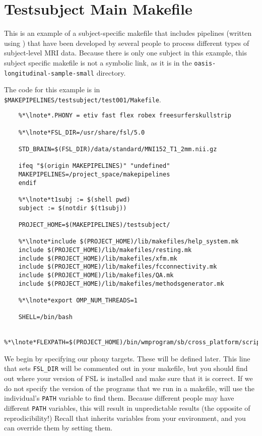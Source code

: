 \section{Testsubject Main Makefile}
\label{example:testsubjectxfm}

This is an example of a subject-specific makefile that includes
pipelines (written using \maken{}) that have been developed by several people to process different types of
subject-level MRI data. Because there is only one subject in
this example, this subject specific makefile is not a symbolic link,
as it is in the \texttt{oasis-longitudinal-sample-small} directory. 

The code for this example is in \texttt{\$MAKEPIPELINES/testsubject/test001/Makefile}. 

\setcounter{codehighlight}{0} %
\begin{lstlisting}
	%*\lnote*.PHONY = etiv fast flex robex freesurferskullstrip 

	%*\lnote*FSL_DIR=/usr/share/fsl/5.0 

	STD_BRAIN=$(FSL_DIR)/data/standard/MNI152_T1_2mm.nii.gz 

	ifeq "$(origin MAKEPIPELINES)" "undefined"
	MAKEPIPELINES=/project_space/makepipelines 
	endif 

	%*\lnote*t1subj := $(shell pwd) 
	subject := $(notdir $(t1subj)) 

	PROJECT_HOME=$(MAKEPIPELINES)/testsubject/

	%*\lnote*include $(PROJECT_HOME)/lib/makefiles/help_system.mk 
	include $(PROJECT_HOME)/lib/makefiles/resting.mk 
	include $(PROJECT_HOME)/lib/makefiles/xfm.mk 
	include $(PROJECT_HOME)/lib/makefiles/fcconnectivity.mk 
	include $(PROJECT_HOME)/lib/makefiles/QA.mk 
	include $(PROJECT_HOME)/lib/makefiles/methodsgenerator.mk

	%*\lnote*export OMP_NUM_THREADS=1 

	SHELL=/bin/bash 

	%*\lnote*FLEXPATH=$(PROJECT_HOME)/bin/wmprogram/sb/cross_platform/scripts

\end{lstlisting}

 We begin by specifying our phony targets. These will be
defined later. 
 This line that sets \texttt{FSL_DIR} will be commented out in
your makefile, but you should find out where your version of FSL is
installed and make sure that it is correct. If we do not specify the
version of the programs that we run in a makefile, \maken{} will use
the individual's \texttt{PATH} variable to find them. Because
different people may have different \texttt{PATH} variables, this will
result in unpredictable results (the opposite of reprodicibility!)
Recall that \maken{} inherits variables from your environment, and you
can override them by setting them.

